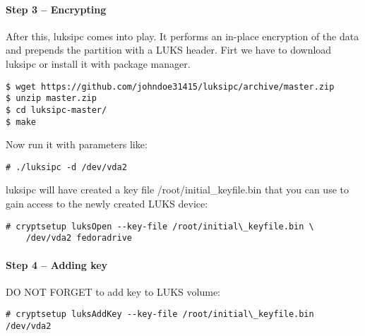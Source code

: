 \paragraph{Step 3 -- Encrypting}
After this, luksipc comes into play. It performs an in-place encryption of the data and prepends the partition with a LUKS header. Firt we have to download luksipc or install it with package manager.
\begin{lstlisting}[columns=fixed,basicstyle=\ttfamily\footnotesize,tabsize=4,backgroundcolor=\color{yellow!10}]
$ wget https://github.com/johndoe31415/luksipc/archive/master.zip
$ unzip master.zip
$ cd luksipc-master/
$ make
\end{lstlisting}
Now run it with parameters like:
\begin{lstlisting}[columns=fixed,basicstyle=\ttfamily\footnotesize,tabsize=4,backgroundcolor=\color{yellow!10}]
# ./luksipc -d /dev/vda2
\end{lstlisting}
luksipc will have created a key file /root/initial\_keyfile.bin that you can use to gain access to the newly created LUKS device:
\begin{lstlisting}[columns=fixed,basicstyle=\ttfamily\footnotesize,tabsize=4,backgroundcolor=\color{yellow!10}]
# cryptsetup luksOpen --key-file /root/initial\_keyfile.bin \
    /dev/vda2 fedoradrive
\end{lstlisting}



\paragraph{Step 4 -- Adding key}
DO NOT FORGET to add key to LUKS volume:
\begin{lstlisting}[columns=fixed,basicstyle=\ttfamily\footnotesize,tabsize=4,backgroundcolor=\color{yellow!10}]
# cryptsetup luksAddKey --key-file /root/initial\_keyfile.bin /dev/vda2
\end{lstlisting}

